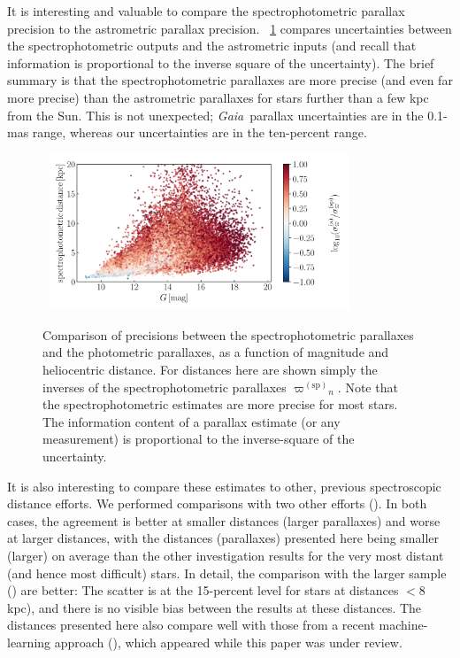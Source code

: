 \documentclass[modern]{aastex62}
\newcommand{\project}[1]{\textsl{#1}}
\newcommand{\gaia}{\project{Gaia}}
\newcommand{\sparallax}{{\varpi^{(\mathrm{sp})}}}
\begin{document}
It is interesting and valuable to compare the spectrophotometric parallax precision to
the astrometric parallax precision.
\figurename~\ref{fig:precision} compares uncertainties between the spectrophotometric
outputs and the astrometric inputs
(and recall that information is proportional to the inverse square of the uncertainty).
The brief summary is that the spectrophotometric parallaxes are more precise (and even
far more precise) than the astrometric parallaxes for stars further than a few kpc from
the Sun.
This is not unexpected; \gaia\ parallax uncertainties are in the 0.1-mas range, whereas
our uncertainties are in the ten-percent range.
\begin{figure}
\centering
~\hfill\includegraphics[width=0.8\textwidth]{./precision.pdf}\hfill~
\caption{Comparison of precisions between the spectrophotometric parallaxes and
the photometric parallaxes, as a function of magnitude and heliocentric distance.
For distances here are shown simply the inverses of the spectrophotometric parallaxes
$\sparallax_n$.
Note that the spectrophotometric estimates are more precise for most stars.
The information content of a parallax estimate (or any measurement)
is proportional to the inverse-square of the uncertainty.\label{fig:precision}}
\end{figure}

It is also interesting to compare these estimates to other, previous
spectroscopic distance efforts.
We performed comparisons with two other efforts (\citealt{sch, que}).
In both cases, the agreement is better at smaller distances (larger
parallaxes) and worse at larger distances, with the distances
(parallaxes) presented here being smaller (larger) on average than the other
investigation results for the very most distant (and hence most difficult) stars.
In detail, the comparison with the larger sample (\citealt{sch})
are better:
The scatter is at the 15-percent level for stars at distances
$<8$\,kpc), and there is no visible bias between the results at these
distances.
The distances presented here also compare well with those from a recent
machine-learning approach (\citealt{leung}), which appeared while this
paper was under review.
\end{document}
